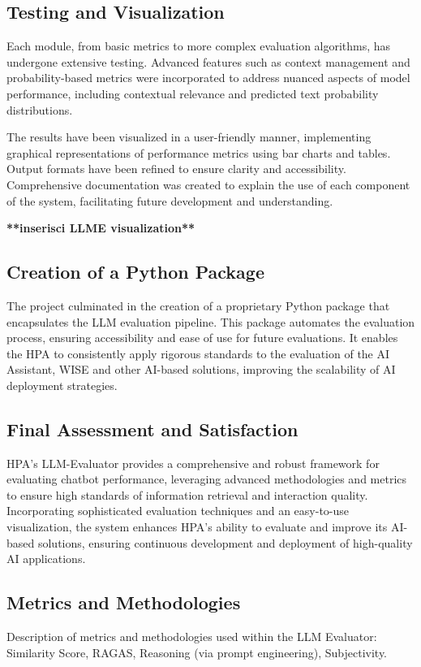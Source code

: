 \subsection{Testing and Visualization}

Each module, from basic metrics to more complex evaluation algorithms, has undergone extensive testing. Advanced features such as context management and probability-based metrics were incorporated to address nuanced aspects of model performance, including contextual relevance and predicted text probability distributions.

The results have been visualized in a user-friendly manner, implementing graphical representations of performance metrics using bar charts and tables. Output formats have been refined to ensure clarity and accessibility. Comprehensive documentation was created to explain the use of each component of the system, facilitating future development and understanding.

\textbf{**inserisci LLME visualization**}

\subsection{Creation of a Python Package}

The project culminated in the creation of a proprietary Python package that encapsulates the LLM evaluation pipeline. This package automates the evaluation process, ensuring accessibility and ease of use for future evaluations. It enables the HPA to consistently apply rigorous standards to the evaluation of the AI Assistant, WISE and other AI-based solutions, improving the scalability of AI deployment strategies.

\subsection{Final Assessment and Satisfaction}

HPA's LLM-Evaluator provides a comprehensive and robust framework for evaluating chatbot performance, leveraging advanced methodologies and metrics to ensure high standards of information retrieval and interaction quality. Incorporating sophisticated evaluation techniques and an easy-to-use visualization, the system enhances HPA's ability to evaluate and improve its AI-based solutions, ensuring continuous development and deployment of high-quality AI applications.

\subsection{Metrics and Methodologies}
Description of metrics and methodologies used within the LLM Evaluator: Similarity Score, RAGAS, Reasoning (via prompt engineering), Subjectivity.

